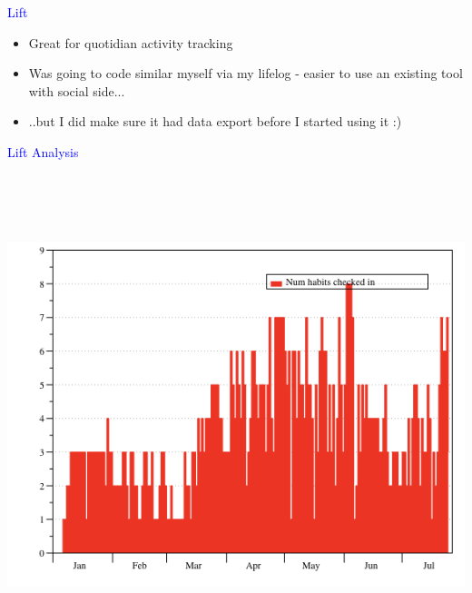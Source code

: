 \documentclass[landscape]{slides}
\begin{document}
\begin{slide}

    \textcolor{blue}{\Large{Lift}}

    \begin{itemize}
        \item Great for quotidian activity tracking
        \item Was going to code similar myself via my lifelog - easier
              to use an existing tool with social side...
        \item ..but I did make sure it had data export before I started using it :)
    \end{itemize}

\end{slide}


\begin{slide}

    \textcolor{blue}{\Large{Lift Analysis}}

    \begin{center}
        \includegraphics[height=14cm]{lift-checkins}
    \end{center}

\end{slide}
\end{document}
